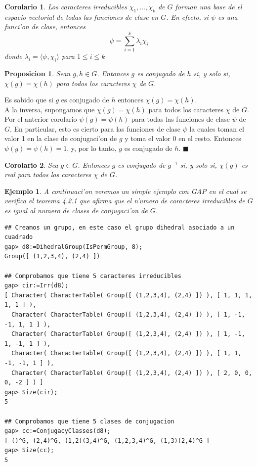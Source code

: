 \documentclass[a4paper,openright,12pt]{book}
\numberwithin{equation}{section} %
\newtheorem{proposicion}{Proposicion}[section] %
\newtheorem{corolario}{Corolario}[section] %
\newtheorem{ejemplo}{Ejemplo}[section] %
\newenvironment{proof}{\noindent{\it Demostracion:}}{\hfill$\blacksquare$} %
\begin{document}
\begin{corolario}
Los caracteres irreducibles $\chi_{1}, \ldots ,\chi_{k}$ de $G$ forman una base de el espacio vectorial de todas las funciones de clase en $G$. En efecto, si $\psi$ es una funci'on de clase, entonces
\[
\psi=\sum_{i=1}^{k}\lambda_{i}\chi_{i}
\]
donde $\lambda_{i} = \langle \psi , \chi_{i} \rangle$ para $1 \leq i \leq k$
\end{corolario}
\begin{proposicion}
Sean $g, h \in G$. Entonces $g$ es conjugado de $h$ si, y solo si, $\chi(g)=\chi(h)$ para todos los caracteres $\chi$ de $G$. 
\end{proposicion}
\begin{proof}
Es sabido que si $g$ es conjugado de $h$ entonces $\chi(g)=\chi(h)$.\\
A la inversa, supongamos que $\chi(g)=\chi(h)$ para todos los caracteres $\chi$ de $G$. Por el anterior corolario $\psi (g) = \psi (h)$ para todas las funciones de clase $\psi$ de $G$. En particular, esto es cierto para las funciones de clase $\psi$ la cuales toman el valor 1 en la clase de conjugaci'on de $g$ y toma el valor 0 en el resto. Entonces $\psi(g)=\psi(h)=1$, y, por lo tanto, $g$ es conjugado de $h$.
\end{proof}
\begin{corolario}
Sea $g \in G$. Entonces $g$ es conjugado de $g^{-1}$ si, y solo si, $\chi (g)$ es real para todos los caracteres $\chi$ de $G$.
\end{corolario}
\begin{ejemplo}
A continuaci'on veremos un simple ejemplo con GAP en el cual se verifica el teorema 4.2.1 que afirma que el n'umero de caracteres irreducibles de $G$ es igual al numero de clases de conjugaci'on de $G$.
\begin{verbatim}
## Creamos un grupo, en este caso el grupo dihedral asociado a un cuadrado 
gap> d8:=DihedralGroup(IsPermGroup, 8);
Group([ (1,2,3,4), (2,4) ])

## Comprobamos que tiene 5 caracteres irreducibles 
gap> cir:=Irr(d8);
[ Character( CharacterTable( Group([ (1,2,3,4), (2,4) ]) ), [ 1, 1, 1, 1, 1 ] ), 
  Character( CharacterTable( Group([ (1,2,3,4), (2,4) ]) ), [ 1, -1, -1, 1, 1 ] ), 
  Character( CharacterTable( Group([ (1,2,3,4), (2,4) ]) ), [ 1, -1, 1, -1, 1 ] ), 
  Character( CharacterTable( Group([ (1,2,3,4), (2,4) ]) ), [ 1, 1, -1, -1, 1 ] ), 
  Character( CharacterTable( Group([ (1,2,3,4), (2,4) ]) ), [ 2, 0, 0, 0, -2 ] ) ]
gap> Size(cir);
5

## Comprobamos que tiene 5 clases de conjugacion
gap> cc:=ConjugacyClasses(d8);
[ ()^G, (2,4)^G, (1,2)(3,4)^G, (1,2,3,4)^G, (1,3)(2,4)^G ]
gap> Size(cc);
5
\end{verbatim}
\end{ejemplo}
\end{document}
